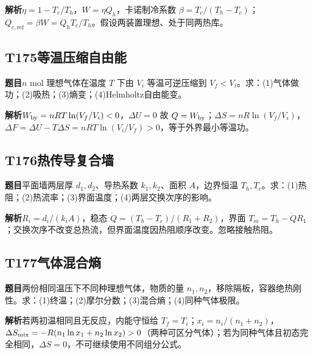 \par\textbf{解析}\quad $\eta=1-T_c/T_h$，$W=\eta Q_h$，卡诺制冷系数 $\beta=T_c/(T_h-T_c)$；$Q_{c,\mathrm{ref}}=\beta W=Q_hT_c/T_h$。假设两装置理想、处于同两热库。

\par\medskip

\subsection*{T175\quad 等温压缩自由能}

\textbf{题目}\quad $n$ mol 理想气体在温度 $T$ 下由 $V_i$ 等温可逆压缩到 $V_f<V_i$。求：(1)气体做功；(2)吸热；(3)熵变；(4)Helmholtz自由能变。

\par\textbf{解析}\quad $W_{\rm by}=nRT\ln(V_f/V_i)<0$，$\Delta U=0$ 故 $Q=W_{\rm by}$；$\Delta S=nR\ln(V_f/V_i)$，$\Delta F=\Delta U-T\Delta S=nRT\ln(V_i/V_f)>0$，等于外界最小等温功。

\par\medskip

\subsection*{T176\quad 热传导复合墙}

\textbf{题目}\quad 平面墙两层厚 $d_1,d_2$、导热系数 $k_1,k_2$、面积 $A$，边界恒温 $T_h,T_c$。求：(1)热阻；(2)热流率；(3)界面温度；(4)两层交换次序的影响。

\par\textbf{解析}\quad $R_i=d_i/(k_iA)$，稳态 $\dot Q=(T_h-T_c)/(R_1+R_2)$，界面 $T_m=T_h-\dot Q R_1$；交换次序不改变总热流，但界面温度因热阻顺序改变。忽略接触热阻。

\par\medskip

\subsection*{T177\quad 气体混合熵}

\textbf{题目}\quad 两份相同温压下不同种理想气体，物质的量 $n_1,n_2$，移除隔板，容器绝热刚性。求：(1)终温；(2)摩尔分数；(3)混合熵；(4)同种气体极限。

\par\textbf{解析}\quad 若两初温相同且无反应，内能守恒给 $T_f=T_i$；$x_i=n_i/(n_1+n_2)$，$\Delta S_{\rm mix}=-R(n_1\ln x_1+n_2\ln x_2)>0$（两种可区分气体）；若为同种气体且初态完全相同，$\Delta S=0$，不可继续使用不同组分公式。

